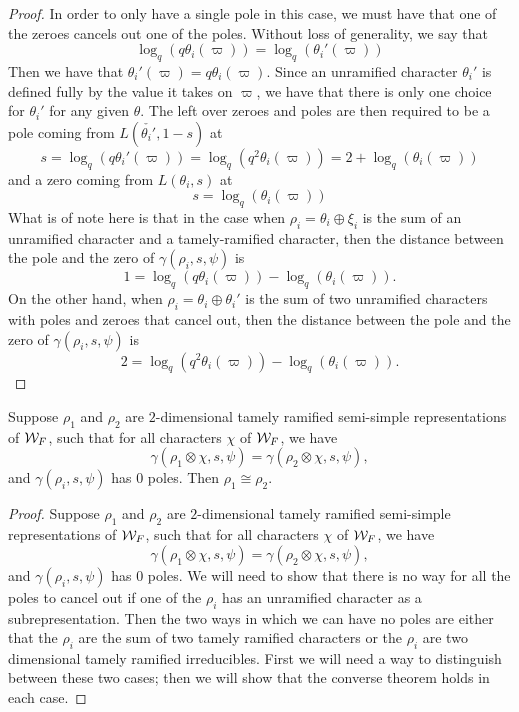 \begin{proof}
  In order to only have a single pole in this case, we must have that one of the zeroes cancels out one of the poles.
  Without loss of generality, we say that \[\log_q(q\theta_i(\varpi)) = \log_q(\theta_i'(\varpi))\]
  Then we have that $\theta_i'(\varpi) = q\theta_i(\varpi)$.
  Since an unramified character $\theta_i'$ is defined fully by the value it takes on $\varpi$, we have that there is only one choice for $\theta_i'$ for any given $\theta$.
  The left over zeroes and poles are then required to be a pole coming from $L(\check{\theta_i'},1-s)$ at 
  \[s = \log_q(q \theta_i'(\varpi)) = \log_q(q^2 \theta_i(\varpi)) = 2 + \log_q(\theta_i(\varpi))\]
  and a zero coming from $L(\theta_i,s)$ at
  \[s = \log_q(\theta_i(\varpi))\]
  What is of note here is that in the case when $\rho_i = \theta_i \oplus \xi_i$ is the sum of an unramified character and a tamely-ramified character, then the distance between the pole and the zero of $\gamma(\rho_i,s,\psi)$ is
  \[1 = \log_q(q\theta_i(\varpi)) - \log_q(\theta_i(\varpi)).\]
  On the other hand, when $\rho_i = \theta_i \oplus \theta_i'$ is the sum of two unramified characters with poles and zeroes that cancel out, then the distance between the pole and the zero of $\gamma(\rho_i,s,\psi)$ is
  \[2 = \log_q(q^2 \theta_i(\varpi)) - \log_q(\theta_i(\varpi)).\]
\end{proof}


\begin{lemma}
  \label{lem:gamma-zero-poles}
  Suppose $\rho_1$ and $\rho_2$ are $2$-dimensional tamely ramified semi-simple representations of $\mathcal{W}_F$, such that for all characters $\chi$ of $\mathcal{W}_F$, we have
  \[\gamma(\rho_1 \otimes \chi,s,\psi) = \gamma(\rho_2 \otimes \chi,s,\psi),\]
  and $\gamma(\rho_i,s,\psi)$ has $0$ poles.
  Then $\rho_1 \cong \rho_2$.
\end{lemma}

\begin{proof}
  Suppose $\rho_1$ and $\rho_2$ are $2$-dimensional tamely ramified semi-simple representations of $\mathcal{W}_F$, such that for all characters $\chi$ of $\mathcal{W}_F$, we have
  \[\gamma(\rho_1 \otimes \chi,s,\psi) = \gamma(\rho_2 \otimes \chi,s,\psi),\]
  and $\gamma(\rho_i,s,\psi)$ has $0$ poles.
  We will need to show that there is no way for all the poles to cancel out if one of the $\rho_i$ has an unramified character as a subrepresentation.
  Then the two ways in which we can have no poles are either that the $\rho_i$ are the sum of two tamely ramified characters or the $\rho_i$ are two dimensional tamely ramified irreducibles.
  First we will need a way to distinguish between these two cases; then we will show that the converse theorem holds in each case.
\end{proof}

